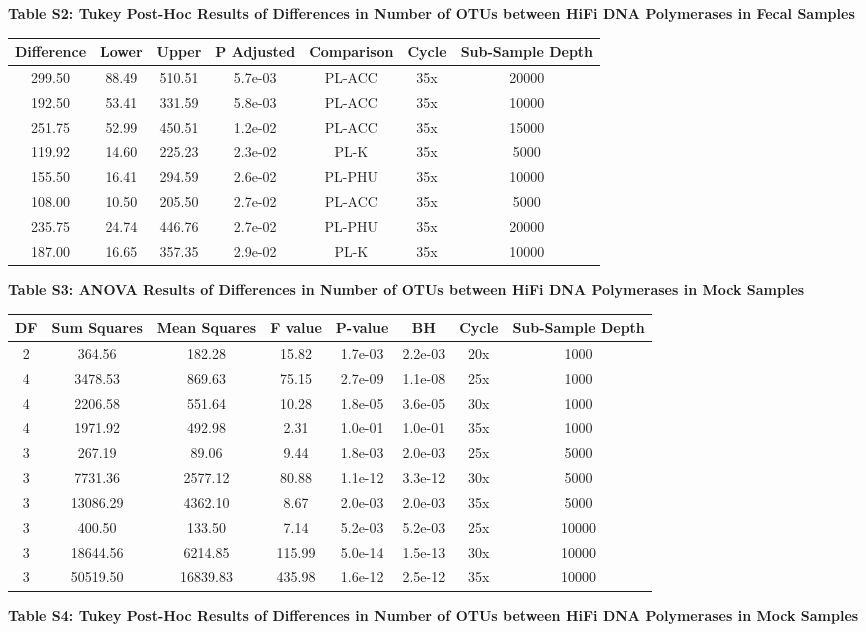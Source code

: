\documentclass[12pt,]{article}
\begin{document}
\newpage

\textbf{Table S2: Tukey Post-Hoc Results of Differences in Number of
OTUs between HiFi DNA Polymerases in Fecal Samples}

\begin{longtable}[]{@{}ccccccc@{}}
\toprule
Difference & Lower & Upper & P Adjusted & Comparison & Cycle &
Sub-Sample Depth\tabularnewline
\midrule
\endhead
299.50 & 88.49 & 510.51 & 5.7e-03 & PL-ACC & 35x & 20000\tabularnewline
192.50 & 53.41 & 331.59 & 5.8e-03 & PL-ACC & 35x & 10000\tabularnewline
251.75 & 52.99 & 450.51 & 1.2e-02 & PL-ACC & 35x & 15000\tabularnewline
119.92 & 14.60 & 225.23 & 2.3e-02 & PL-K & 35x & 5000\tabularnewline
155.50 & 16.41 & 294.59 & 2.6e-02 & PL-PHU & 35x & 10000\tabularnewline
108.00 & 10.50 & 205.50 & 2.7e-02 & PL-ACC & 35x & 5000\tabularnewline
235.75 & 24.74 & 446.76 & 2.7e-02 & PL-PHU & 35x & 20000\tabularnewline
187.00 & 16.65 & 357.35 & 2.9e-02 & PL-K & 35x & 10000\tabularnewline
\bottomrule
\end{longtable}

\newpage

\textbf{Table S3: ANOVA Results of Differences in Number of OTUs between
HiFi DNA Polymerases in Mock Samples}

\begin{longtable}[]{@{}cccccccc@{}}
\toprule
DF & Sum Squares & Mean Squares & F value & P-value & BH & Cycle &
Sub-Sample Depth\tabularnewline
\midrule
\endhead
2 & 364.56 & 182.28 & 15.82 & 1.7e-03 & 2.2e-03 & 20x &
1000\tabularnewline
4 & 3478.53 & 869.63 & 75.15 & 2.7e-09 & 1.1e-08 & 25x &
1000\tabularnewline
4 & 2206.58 & 551.64 & 10.28 & 1.8e-05 & 3.6e-05 & 30x &
1000\tabularnewline
4 & 1971.92 & 492.98 & 2.31 & 1.0e-01 & 1.0e-01 & 35x &
1000\tabularnewline
3 & 267.19 & 89.06 & 9.44 & 1.8e-03 & 2.0e-03 & 25x &
5000\tabularnewline
3 & 7731.36 & 2577.12 & 80.88 & 1.1e-12 & 3.3e-12 & 30x &
5000\tabularnewline
3 & 13086.29 & 4362.10 & 8.67 & 2.0e-03 & 2.0e-03 & 35x &
5000\tabularnewline
3 & 400.50 & 133.50 & 7.14 & 5.2e-03 & 5.2e-03 & 25x &
10000\tabularnewline
3 & 18644.56 & 6214.85 & 115.99 & 5.0e-14 & 1.5e-13 & 30x &
10000\tabularnewline
3 & 50519.50 & 16839.83 & 435.98 & 1.6e-12 & 2.5e-12 & 35x &
10000\tabularnewline
\bottomrule
\end{longtable}

\newpage

\textbf{Table S4: Tukey Post-Hoc Results of Differences in Number of
OTUs between HiFi DNA Polymerases in Mock Samples}
\end{document}
